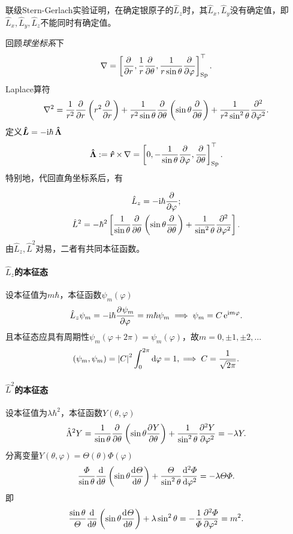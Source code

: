 联级Stern-Gerlach实验证明，在确定银原子的$\hat L_z$时，其$\hat L_x,\hat L_y$没有确定值，即$\hat L_x,\hat L_y,\hat L_z$不能同时有确定值。

回顾\textit{球坐标系}下
\[
	\nabla=\fkh{\pp r,\frac1r\pp\theta,\frac1{r\sin\theta}\pp\varphi}\tp_\mathrm{Sp}.
\]
Laplace算符
\[
	\nabla^2=\frac1{r^2}\pp r\kh{r^2\pp r}+\frac1{r^2\sin\theta}\pp\theta\kh{\sin\theta\pp\theta}+\frac1{r^2\sin^2\theta}\pp[2]\varphi.
\]
定义$\qo L=-\i\hbar\,\qo\Lambda$
\[
	\qo\Lambda:=\qo r\times\,\nabla=\fkh{0,-\frac1{\sin\theta}\pp\varphi,\pp\theta}\tp_\mathrm{Sp}.
\]
特别地，代回直角坐标系后，有
\iffalse
	\begin{align*}
		\hat L_x & =\i\hbar\kh{+\sin\varphi\pp\theta+\cot\theta\cos\varphi\pp\varphi} \\
		\hat L_y & =\i\hbar\kh{-\cos\varphi\pp\theta+\cot\theta\sin\varphi\pp\varphi} \\
		\hat L_z & =-\i\hbar\pp\varphi.
	\end{align*}
\fi
\begin{gather}
	\hat L_z=-\i\hbar\pp\varphi;\\
	\hat L^2=-\hbar^2\fkh{\frac1{\sin\theta}\pp\theta\kh{\sin\theta\pp\theta}+\frac1{\sin^2\theta}\pp[2]\varphi}.
\end{gather}
由$\hat L_z,\hat L^2$对易，二者有共同本征函数。
\paragraph{$\hat L_z$的本征态}设本征值为$m\hbar$，本征函数$\psi_m(\varphi)$
\[
	\hat L_z\psi_m=-\i\hbar\pv{\psi_m}\varphi=m\hbar\psi_m\implies\psi_m=C\e{\i m\varphi}.
\]
且本征态应具有周期性$\psi_m(\varphi+2\pi)=\psi_m(\varphi)$，故$m=0,\pm 1,\pm 2,\ldots$
\[
	(\psi_m,\psi_m)=\abs C^2\int_0^{2\pi}\d\varphi=1,\implies C=\frac1{\sqrt{2\pi}}.
\]
\paragraph{$\hat L^2$的本征态}设本征值为$\lambda\hbar^2$，本征函数$Y(\theta,\varphi)$
\[
	\hat\Lambda^2Y=\frac1{\sin\theta}\pp\theta\kh{\sin\theta\pv Y\theta}+\frac1{\sin^2\theta}\pv[2]Y\varphi=-\lambda Y.
\]
分离变量$Y(\theta,\varphi)=\varTheta(\theta)\varPhi(\varphi)$
\[
	\frac\varPhi{\sin\theta}\dd\theta\kh{\sin\theta\dv\varTheta\theta}+\frac\varTheta{\sin^2\theta}\dv[2]\varPhi\varphi=-\lambda\varTheta\varPhi.
\]
即
\[
	\frac{\sin\theta}\varTheta\dd\theta\kh{\sin\theta\dv\varTheta\theta}+\lambda\sin^2\theta=-\frac1\varPhi\pv[2]\varPhi\varphi=m^2.
\]

